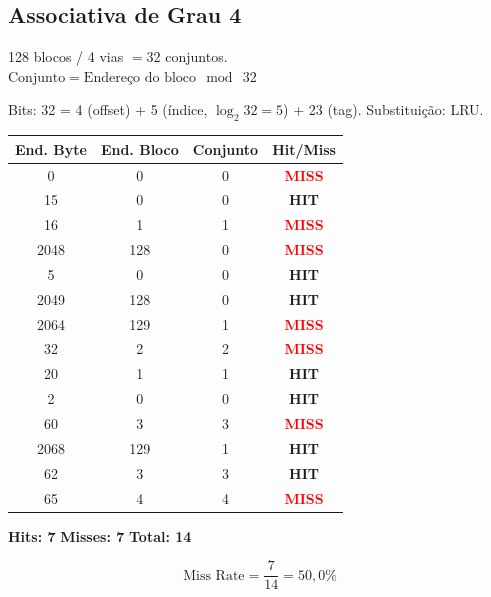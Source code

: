\documentclass[12pt, a4paper]{article}
\begin{document}
\subsection{Associativa de Grau 4}

128 blocos / 4 vias $= 32$ conjuntos.\\
$\text{Conjunto} = \text{Endereço do bloco}\ \bmod\ 32$

Bits: 32 = 4 (offset) + 5 (índice, $\log_2 32 = 5$) + 23 (tag). Substituição: LRU.

\vspace{4pt}
\begin{tabular}{cccc}
  \toprule
  \textbf{End. Byte} & \textbf{End. Bloco} & \textbf{Conjunto} & \textbf{Hit/Miss}\\
  \midrule
  0    & 0   & 0 & \textcolor{red}{\textbf{MISS}} \\
  15   & 0   & 0 & \textcolor{green!60!black}{\textbf{HIT}}  \\
  16   & 1   & 1 & \textcolor{red}{\textbf{MISS}} \\
  2048 & 128 & 0 & \textcolor{red}{\textbf{MISS}} \\
  5    & 0   & 0 & \textcolor{green!60!black}{\textbf{HIT}}  \\
  2049 & 128 & 0 & \textcolor{green!60!black}{\textbf{HIT}}  \\
  2064 & 129 & 1 & \textcolor{red}{\textbf{MISS}} \\
  32   & 2   & 2 & \textcolor{red}{\textbf{MISS}} \\
  20   & 1   & 1 & \textcolor{green!60!black}{\textbf{HIT}}  \\
  2    & 0   & 0 & \textcolor{green!60!black}{\textbf{HIT}}  \\
  60   & 3   & 3 & \textcolor{red}{\textbf{MISS}} \\
  2068 & 129 & 1 & \textcolor{green!60!black}{\textbf{HIT}}  \\
  62   & 3   & 3 & \textcolor{green!60!black}{\textbf{HIT}}  \\
  65   & 4   & 4 & \textcolor{red}{\textbf{MISS}} \\
  \bottomrule
\end{tabular}

\vspace{6pt}
\textbf{Hits: 7} \quad \textbf{Misses: 7} \quad \textbf{Total: 14}

\begin{caixaazul}
  \[
    \text{Miss Rate} = \frac{7}{14} = 50{,}0\%
  \]
\end{caixaazul}
\end{document}
